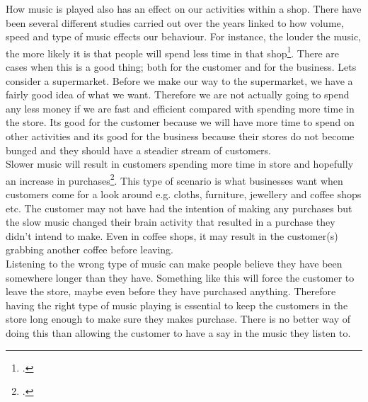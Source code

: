 How music is played also has an effect on our activities within a shop.  There have been several different studies carried out over the years linked to how volume, speed and type of music effects our behaviour.  For instance, the louder the music, the more likely it is that people will spend less time in that shop\footcite{annoying-music}.  There are cases when this is a good thing; both for the customer and for the business.  Lets consider a supermarket.  Before we make our way to the supermarket, we have a fairly good idea of what we want.  Therefore we are not actually going to spend any less money if we are fast and efficient compared with spending more time in the store.  Its good for the customer because we will have more time to spend on other activities and its good for the business because their stores do not become bunged and they should have a steadier stream of customers.  \\
Slower music will result in customers spending more time in store and hopefully an increase in purchases\footcite{annoying-music}.  This type of scenario is what businesses want when customers come for a look around e.g. cloths, furniture, jewellery and coffee shops etc.  The customer may not have had the intention of making any purchases but the slow music changed their brain activity that resulted in a purchase they didn't intend to make.  Even in coffee shops, it may result in the customer(s) grabbing another coffee before leaving. \\
Listening to the wrong type of music can make people believe they have been somewhere longer than they have.  Something like this will force the customer to leave the store, maybe even before they have purchased anything.  Therefore having the right type of music playing is essential to keep the customers in the store long enough to make sure they makes purchase.  There is no better way of doing this than allowing the customer to have a say in the music they listen to. 

